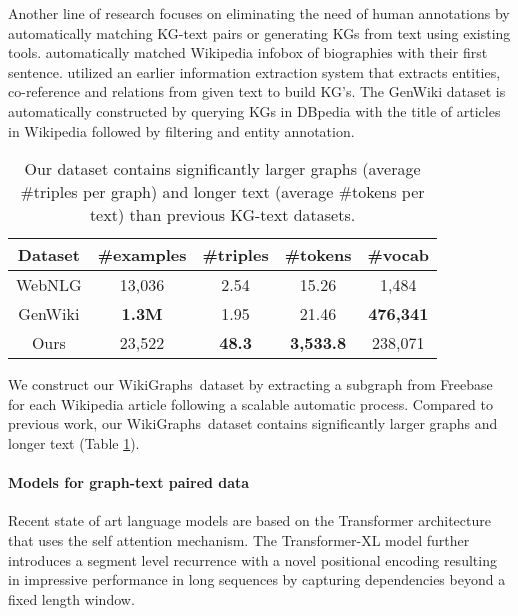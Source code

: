 \documentclass[11pt]{article}
\newcommand{\ourdataset}{{WikiGraphs}}
\newcommand{\tabref}[1]{Table \ref{#1}}
\begin{document}
Another line of research focuses on eliminating the need of human annotations by automatically matching KG-text pairs or generating KGs from text using existing tools. \citet{lebret-etal-2016-neural} automatically matched Wikipedia infobox of biographies with their first sentence.
\citet{koncel-kedziorski-etal-2019-text} utilized an earlier information extraction system that extracts entities, co-reference and relations from given text to build KG's. 
The GenWiki dataset \cite{jin-etal-2020-genwiki} is automatically constructed by querying KGs in DBpedia with the title of articles in Wikipedia followed by filtering and entity annotation. 



\begin{table}[t]
    \centering
    \setlength{\tabcolsep}{3pt}
    \begin{tabular}{c|c|c|c|c}
    \hline
        Dataset & \#examples & \#triples & \#tokens & \#vocab \\
        \hline
        WebNLG &13,036 & 2.54 & 15.26 & 1,484 \\
        GenWiki & \bf{1.3M} & 1.95 & 21.46 & \bf{476,341} \\
        Ours & 23,522 & \bf{48.3} & \bf{3,533.8} & 238,071\\
        \hline
    \end{tabular}
    \caption{Our dataset contains significantly larger graphs (average \#triples per graph) and longer text (average \#tokens per text) than previous KG-text datasets. }
    \label{tab:dataset-comparison}
\end{table}

We construct our \ourdataset~dataset by extracting a subgraph from Freebase \cite{bollacker2008freebase} for each Wikipedia article following a scalable automatic process.  Compared to previous work, our \ourdataset~dataset contains significantly larger graphs and longer text (\tabref{tab:dataset-comparison}).

\paragraph{Models for graph-text paired data}
Recent state of art language models are based on the Transformer architecture \cite{Vaswani2017} that uses the
self attention mechanism.
The Transformer-XL \cite{dai2019transformer} model further introduces a segment level recurrence with a novel positional encoding resulting in impressive performance in long sequences by capturing dependencies beyond a fixed length window.
\end{document}
